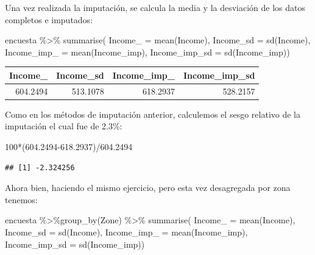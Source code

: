 \documentclass[
  12pt,
]{book}
\newenvironment{Shaded}{\begin{snugshade}}{\end{snugshade}}
\newcommand{\AttributeTok}[1]{\textcolor[rgb]{0.77,0.63,0.00}{#1}}
\newcommand{\DecValTok}[1]{\textcolor[rgb]{0.00,0.00,0.81}{#1}}
\newcommand{\FloatTok}[1]{\textcolor[rgb]{0.00,0.00,0.81}{#1}}
\newcommand{\FunctionTok}[1]{\textcolor[rgb]{0.00,0.00,0.00}{#1}}
\newcommand{\NormalTok}[1]{#1}
\newcommand{\SpecialCharTok}[1]{\textcolor[rgb]{0.00,0.00,0.00}{#1}}
\begin{document}
Una vez realizada la imputación, se calcula la media y la desviación de los datos completos e imputados:

\begin{Shaded}
\begin{Highlighting}[]
\NormalTok{encuesta }\SpecialCharTok{\%\textgreater{}\%} \FunctionTok{summarise}\NormalTok{(}
  \AttributeTok{Income\_ =} \FunctionTok{mean}\NormalTok{(Income),}
  \AttributeTok{Income\_sd =} \FunctionTok{sd}\NormalTok{(Income),}
  \AttributeTok{Income\_imp\_ =} \FunctionTok{mean}\NormalTok{(Income\_imp),}
  \AttributeTok{Income\_imp\_sd =} \FunctionTok{sd}\NormalTok{(Income\_imp))}
\end{Highlighting}
\end{Shaded}

\begin{tabular}{r|r|r|r}
\hline
Income\_ & Income\_sd & Income\_imp\_ & Income\_imp\_sd\\
\hline
604.2494 & 513.1078 & 618.2937 & 528.2157\\
\hline
\end{tabular}

Como en los métodos de imputación anterior, calculemos el sesgo relativo de la imputación el cual fue de 2.3\%:

\begin{Shaded}
\begin{Highlighting}[]
\DecValTok{100}\SpecialCharTok{*}\NormalTok{(}\FloatTok{604.2494{-}618.2937}\NormalTok{)}\SpecialCharTok{/}\FloatTok{604.2494}
\end{Highlighting}
\end{Shaded}

\begin{verbatim}
## [1] -2.324256
\end{verbatim}

Ahora bien, haciendo el mismo ejercicio, pero esta vez desagregada por zona tenemos:

\begin{Shaded}
\begin{Highlighting}[]
\NormalTok{encuesta }\SpecialCharTok{\%\textgreater{}\%}\FunctionTok{group\_by}\NormalTok{(Zone) }\SpecialCharTok{\%\textgreater{}\%}  \FunctionTok{summarise}\NormalTok{(}
  \AttributeTok{Income\_ =} \FunctionTok{mean}\NormalTok{(Income),}
  \AttributeTok{Income\_sd =} \FunctionTok{sd}\NormalTok{(Income),}
  \AttributeTok{Income\_imp\_ =} \FunctionTok{mean}\NormalTok{(Income\_imp),}
  \AttributeTok{Income\_imp\_sd =} \FunctionTok{sd}\NormalTok{(Income\_imp))}
\end{Highlighting}
\end{Shaded}
\end{document}
